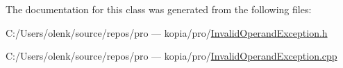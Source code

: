 The documentation for this class was generated from the following files\+:\begin{DoxyCompactItemize}
\item 
C\+:/\+Users/olenk/source/repos/pro — kopia/pro/\mbox{\hyperlink{_invalid_operand_exception_8h}{Invalid\+Operand\+Exception.\+h}}\item 
C\+:/\+Users/olenk/source/repos/pro — kopia/pro/\mbox{\hyperlink{_invalid_operand_exception_8cpp}{Invalid\+Operand\+Exception.\+cpp}}\end{DoxyCompactItemize}
